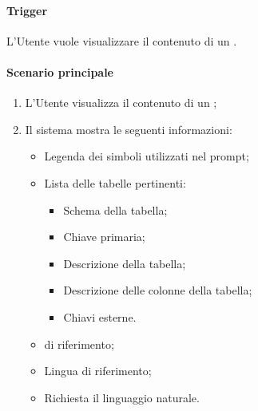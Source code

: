 \paragraph*{Trigger}
L'Utente vuole visualizzare il contenuto di un .

\paragraph*{Scenario principale}
\begin{enumerate}
  \item L'Utente visualizza il contenuto di un ;
  \item Il sistema mostra le seguenti informazioni:
  \begin{itemize}
    \item Legenda dei simboli utilizzati nel prompt;
    \item Lista delle tabelle pertinenti:
    \begin{itemize}
      \item Schema della tabella;
      \item Chiave primaria;
      \item Descrizione della tabella;
      \item Descrizione delle colonne della tabella;
      \item Chiavi esterne.
    \end{itemize}
    \item {} di riferimento;
    \item Lingua di riferimento;
    \item Richiesta il linguaggio naturale.
  \end{itemize}
\end{enumerate}
